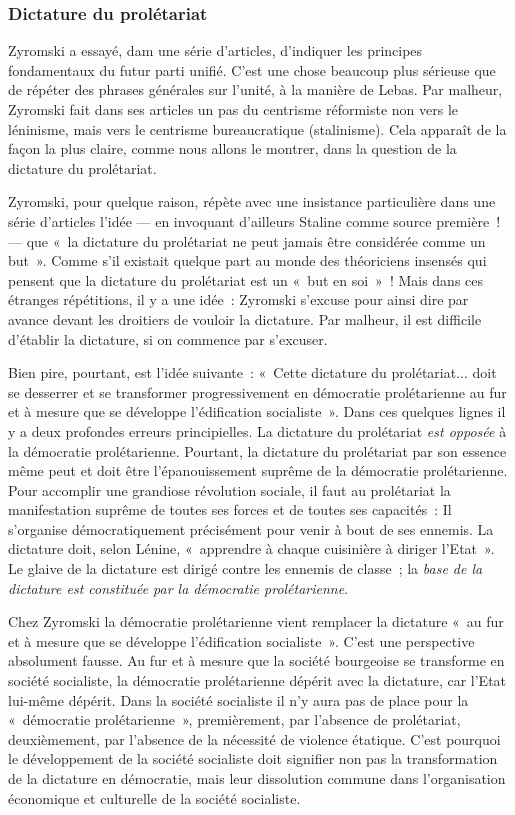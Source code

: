 \documentclass[french,twoside]{book} %
\begin{document}
 \subsubsection[{Dictature du prolétariat}]{Dictature du prolétariat}
\noindent Zyromski a essayé, dam une série d’articles, d’indiquer les principes fondamentaux du futur parti unifié. C’est une chose beaucoup plus sérieuse que de répéter des phrases générales sur l’unité, à la manière de Lebas. Par malheur, Zyromski fait dans ses articles un pas du centrisme réformiste non vers le léninisme, mais vers le centrisme bureaucratique (stalinisme). Cela apparaît de la façon la plus claire, comme nous allons le montrer, dans la question de la dictature du prolétariat.\par
Zyromski, pour quelque raison, répète avec une insistance particulière dans une série d’articles l’idée — en invoquant d’ailleurs Staline comme source première ! — que « la dictature du prolétariat ne peut jamais être considérée comme un but ». Comme s’il existait quelque part au monde des théoriciens insensés qui pensent que la dictature du prolétariat est un « but en soi » ! Mais dans ces étranges répétitions, il y a une idée : Zyromski s’excuse pour ainsi dire par avance devant les droitiers de vouloir la dictature. Par malheur, il est difficile d’établir la dictature, si on commence par s’excuser.\par
Bien pire, pourtant, est l’idée suivante : « Cette dictature du prolétariat... doit se desserrer et se transformer progressivement en démocratie prolétarienne au fur et à mesure que se développe l’édification socialiste ». Dans ces quelques lignes il y a deux profondes erreurs principielles. La dictature du prolétariat \emph{est opposée} à la démocratie prolétarienne. Pourtant, la dictature du prolétariat par son essence même peut et doit être l’épanouissement suprême de la démocratie prolétarienne. Pour accomplir une grandiose révolution sociale, il faut au prolétariat la manifestation suprême de toutes ses forces et de toutes ses capacités : Il s’organise démocratiquement précisément pour venir à bout de ses ennemis. La dictature  doit, selon Lénine, « apprendre à chaque cuisinière à diriger l’Etat ». Le glaive de la dictature est dirigé contre les ennemis de classe ; la \emph{base de la dictature est constituée par la démocratie prolétarienne}.\par
Chez Zyromski la démocratie prolétarienne vient remplacer la dictature « au fur et à mesure que se développe l’édification socialiste ». C’est une perspective absolument fausse. Au fur et à mesure que la société bourgeoise se transforme en société socialiste, la démocratie prolétarienne dépérit avec la dictature, car l’Etat lui-même dépérit. Dans la société socialiste il n’y aura pas de place pour la « démocratie prolétarienne », premièrement, par l’absence de prolétariat, deuxièmement, par l’absence de la nécessité de violence étatique. C’est pourquoi le développement de la société socialiste doit signifier non pas la transformation de la dictature en démocratie, mais leur dissolution commune dans l’organisation économique et culturelle de la société socialiste.
\end{document}
